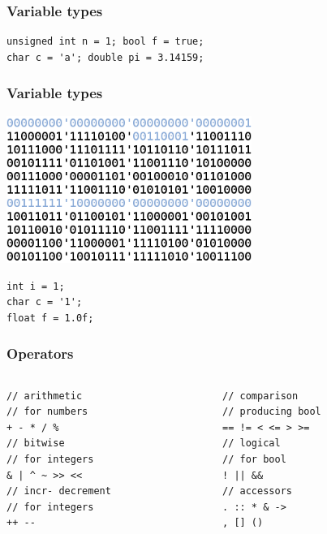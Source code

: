 \begin{frame}[fragile]
\frametitle{Variable types}
\begin{lstlisting}
unsigned int n = 1; bool f = true;
char c = 'a'; double pi = 3.14159;
\end{lstlisting}
\end{frame}

\begin{frame}[fragile]
\frametitle{Variable types}
\begin{center}
\includegraphics[width=0.6\textwidth]{figures/bits}
\end{center}
\lstset{
	xleftmargin=3cm
}
\begin{lstlisting}
int i = 1;
char c = '1';
float f = 1.0f;
\end{lstlisting}
\end{frame}

\begin{frame}[fragile]
\frametitle{Operators}
\begin{columns}[c]
  \begin{column}{0.5\textwidth}
\begin{lstlisting}
// arithmetic
// for numbers
+ - * / %
// bitwise
// for integers
& | ^ ~ >> <<
// incr- decrement
// for integers
++ --
\end{lstlisting}
  \end{column}
  \begin{column}{0.5\textwidth}
\begin{lstlisting}
// comparison
// producing bool
== != < <= > >=
// logical
// for bool
! || &&
// accessors
. :: * & ->
, [] ()
\end{lstlisting}
  \end{column}
\end{columns}
\end{frame}

